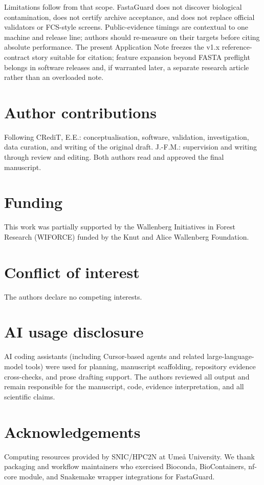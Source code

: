 \documentclass[11pt,a4paper]{article}
\begin{document}
Limitations follow from that scope.
FastaGuard does not discover biological contamination, does not certify archive
acceptance, and does not replace official validators or FCS-style screens.
Public-evidence timings are contextual to one machine and release line; authors
should re-measure on their targets before citing absolute performance.
The present Application Note freezes the v1.x reference-contract story suitable
for citation; feature expansion beyond FASTA preflight belongs in software
releases and, if warranted later, a separate research article rather than an
overloaded note.

\section*{Author contributions}
Following CRediT, E.E.: conceptualisation, software, validation, investigation,
data curation, and writing of the original draft. J.-F.M.: supervision and
writing through review and editing. Both authors read and approved the final
manuscript.

\section*{Funding}
This work was partially supported by the Wallenberg Initiatives in Forest
Research (WIFORCE) funded by the Knut and Alice Wallenberg Foundation.

\section*{Conflict of interest}
The authors declare no competing interests.

\section*{AI usage disclosure}
AI coding assistants (including Cursor-based agents and related large-language-model
tools) were used for planning, manuscript scaffolding, repository evidence
cross-checks, and prose drafting support.
The authors reviewed all output and remain responsible for the manuscript, code,
evidence interpretation, and all scientific claims.

\section*{Acknowledgements}
Computing resources provided by SNIC/HPC2N at Ume{\aa} University.
We thank packaging and workflow maintainers who exercised Bioconda,
BioContainers, nf-core module, and Snakemake wrapper integrations for FastaGuard.
\end{document}
